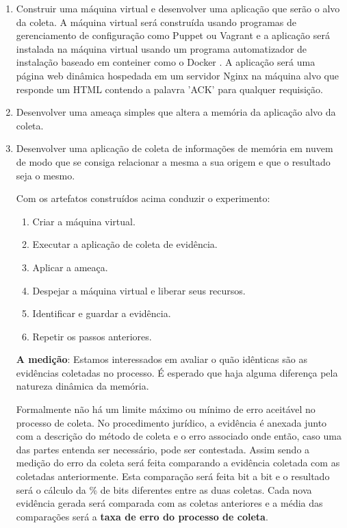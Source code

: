 \documentclass[12pt,				%
	openright,			%
	oneside,			%
	a4paper,			%
	english,			%
	brazil				%
	]{abntex2}
\begin{document}
\begin{enumerate}
 \item Construir uma máquina virtual e desenvolver uma aplicação que serão o alvo da coleta. A máquina virtual será construída usando programas de gerenciamento 
 de configuração como Puppet \cite{Wikipedia2015} ou Vagrant\cite{Wikipedia2016} e a aplicação será instalada na máquina virtual usando um programa automatizador de 
 instalação baseado em conteiner como o Docker \cite{Wikipedia2016a}. A aplicação será uma página web dinâmica hospedada em um servidor Nginx \cite{Wikipedia2015a} na
 máquina alvo que responde um HTML contendo a palavra 'ACK' para qualquer requisição.
 
 \item Desenvolver uma ameaça simples que altera a memória da aplicação alvo da coleta.
 
 \item Desenvolver uma aplicação de coleta de informações de memória em nuvem de modo que se consiga relacionar a mesma a sua origem e que o resultado seja o mesmo.
 
 Com os artefatos construídos acima conduzir o experimento:

\begin{enumerate}
 \item Criar a máquina virtual.
 \item Executar a aplicação de coleta de evidência.
 \item Aplicar a ameaça.
 \item Despejar a máquina virtual e liberar seus recursos.
 \item Identificar e guardar a evidência.
 \item Repetir os passos anteriores.
\end{enumerate}

\textbf{A medição}: Estamos interessados em avaliar o quão idênticas são as evidências coletadas no processo. É esperado que haja alguma diferença pela natureza dinâmica da memória. 

Formalmente não há um limite máximo ou mínimo de erro aceitável no processo de coleta. No procedimento jurídico, a evidência é anexada junto com a descrição do método 
de coleta e o erro associado onde então, caso uma das partes entenda ser necessário, pode ser contestada. Assim sendo a medição do erro da coleta será feita comparando 
a evidência coletada com as coletadas anteriormente. Esta comparação será feita bit a bit e o resultado será o cálculo da \% de bits diferentes entre as duas coletas. 
Cada nova evidência gerada será comparada com as coletas anteriores e a média das comparações será a \textbf{taxa de erro do processo de coleta}.

\end{enumerate}
\end{document}
